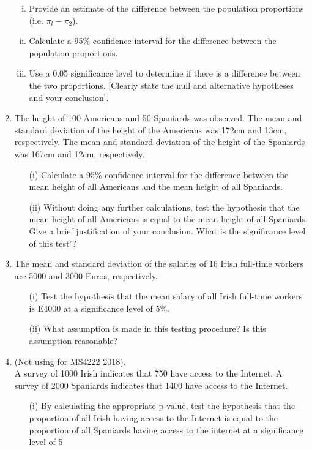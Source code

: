 \documentclass[]{article}
\begin{document}
\begin{enumerate}
\begin{enumerate}[(i)]
	\item Provide an estimate of the difference between the population
	proportions (i.e. $\pi_l -\pi_2$).
	\item Calculate a 95\% confidence interval for the difference between the
	population proportions.
	\item Use a 0.05 significance level to determine if there is a difference
	between the two proportions. [Clearly state the null and alternative hypotheses
	and your conclusion].
\end{enumerate}

\item 
The height of 100 Americans and 50 Spaniards was observed. The mean and
standard deviation of the height of the Americans was 172cm and 13cm,
respectively. The mean and standard deviation of the height of the Spaniards
was 167cm and 12cm, respectively.

\begin{itemize}
	\item[(i)]Calculate a 95\% confidence interval for the difference between the mean height
	of all Americans and the mean height of all Spaniards.
	
	
	\item[(ii)] Without doing any further calculations, test the hypothesis that the mean
	height of all Americans is equal to the mean height of all Spaniards. Give a brief
	justification of your conclusion. What is the significance level of this test'?
\end{itemize}

\item 
The mean and standard deviation of the salaries of 16 Irish full-time workers are 5000 and 3000 Euros, respectively.
\begin{itemize}
	\item[(i)] Test the hypothesis that the mean salary of all Irish full-time workers is E4000 at a significance level of 5\%.
	\item[(ii)] What assumption is made in this testing procedure? Is this assumption reasonable?
\end{itemize}

\item (Not using for MS4222 2018).\\
A survey of 1000 Irish indicates that 750 have access to the Internet. A survey of 2000 Spaniards
indicates that 1400 have access to the Internet.
\begin{itemize}
	\item[(i)]  By calculating the appropriate p-value, test the hypothesis that the proportion of all Irish
	having access to the Internet is equal to the proportion of all Spaniards having access to the
	internet at a significance level of 5%
	

\end{itemize}
\end{enumerate}
\end{document}
